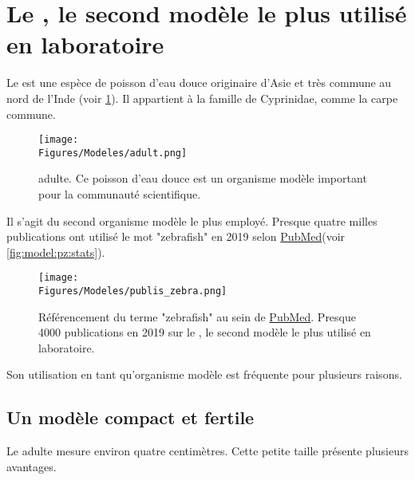 \documentclass[\main/main.tex]{subfiles}
\begin{document}
            
\section{Le \pz{}, le second modèle le plus utilisé en laboratoire}

%
Le \pz{} est une espèce de poisson d'eau douce originaire d'Asie et très commune au nord de l'Inde (voir \ref{fig:model:zebra}).
%
Il appartient à la famille de Cyprinidae, comme la carpe commune.

\begin{figure}[h!]{\textwidth} 
    \centering
       \centering \texttt{[image: \\Figures/Modeles/adult.png]}
       \caption{
            \label{fig:model:zebra}\pz{} adulte. \newline
            Ce poisson d'eau douce est un organisme modèle important pour la communauté scientifique.
            }
\end{figure}

%
Il s'agit du second organisme modèle le plus employé.
%
Presque quatre milles publications ont utilisé le mot "zebrafish" en 2019
selon \href{https://pubmed.ncbi.nlm.nih.gov/?term=zebrafish&sort=pubdate}{PubMed}(voir \autoref{fig:model:pz:stats}).

\begin{figure}[h!]{\textwidth} 
    \centering
       \centering \texttt{[image: \\Figures/Modeles/publis\_zebra.png]}
       \caption{
            \label{fig:model:pz:stats}Référencement du terme "zebrafish" au sein de \href{https://pubmed.ncbi.nlm.nih.gov/?term=zebrafish&sort=pubdate}{PubMed}.
            \newline
            Presque 4000 publications en 2019 sur le \pz{}, le second modèle le plus utilisé en laboratoire.
            }
\end{figure}
%
Son utilisation en tant qu'organisme modèle est fréquente pour plusieurs raisons.

    \subsection{Un modèle compact et fertile}
    
%
Le \pz{} adulte mesure environ quatre centimètres.
%
Cette petite taille présente plusieurs avantages.
\end{document}
